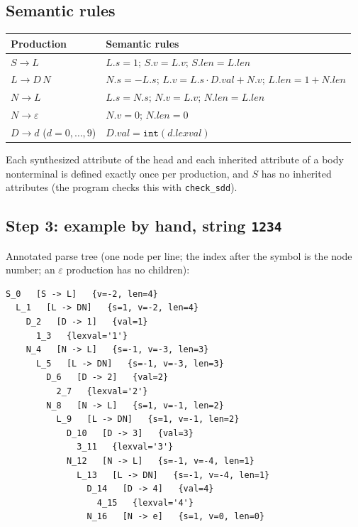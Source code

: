 \documentclass[11pt]{article}
\begin{document}
\subsection{Semantic rules}
\begin{center}
\begin{tabular}{ll}
\toprule
Production & Semantic rules\\
\midrule
$S\to L$ & $L.s=1$;\; $S.v=L.v$;\; $S.len=L.len$\\
$L\to D\,N$ & $N.s=-L.s$;\; $L.v=L.s\cdot D.val+N.v$;\; $L.len=1+N.len$\\
$N\to L$ & $L.s=N.s$;\; $N.v=L.v$;\; $N.len=L.len$\\
$N\to\varepsilon$ & $N.v=0$;\; $N.len=0$\\
$D\to d$ ($d=0,\dots,9$) & $D.val=\texttt{int}(d.lexval)$\\
\bottomrule
\end{tabular}
\end{center}
Each synthesized attribute of the head and each inherited attribute of a body nonterminal is defined exactly once
per production, and $S$ has no inherited attributes (the program checks this with \texttt{check\_sdd}).

\subsection{Step 3: example by hand, string \texttt{1234}}
Annotated parse tree (one node per line; the index after the symbol is the node number; an $\varepsilon$ production has no children):
\begin{verbatim}
S_0   [S -> L]   {v=-2, len=4}
  L_1   [L -> DN]   {s=1, v=-2, len=4}
    D_2   [D -> 1]   {val=1}
      1_3   {lexval='1'}
    N_4   [N -> L]   {s=-1, v=-3, len=3}
      L_5   [L -> DN]   {s=-1, v=-3, len=3}
        D_6   [D -> 2]   {val=2}
          2_7   {lexval='2'}
        N_8   [N -> L]   {s=1, v=-1, len=2}
          L_9   [L -> DN]   {s=1, v=-1, len=2}
            D_10   [D -> 3]   {val=3}
              3_11   {lexval='3'}
            N_12   [N -> L]   {s=-1, v=-4, len=1}
              L_13   [L -> DN]   {s=-1, v=-4, len=1}
                D_14   [D -> 4]   {val=4}
                  4_15   {lexval='4'}
                N_16   [N -> e]   {s=1, v=0, len=0}

\end{verbatim}
\end{document}
